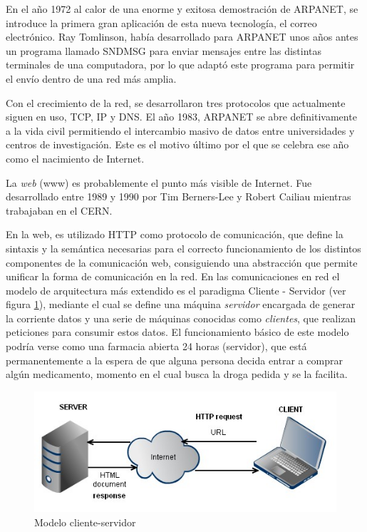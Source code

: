 En el año 1972 al calor de una enorme y exitosa demostración de \ac{ARPANET}, se introduce la primera gran aplicación de esta nueva tecnología, el correo electrónico. Ray Tomlinson, había desarrollado para \ac{ARPANET} unos años antes un programa llamado SNDMSG para enviar mensajes entre las distintas terminales de una computadora, por lo que adaptó este programa para permitir el envío dentro de una red más amplia.

Con el crecimiento de la red, se desarrollaron tres protocolos que actualmente siguen en uso, \ac{TCP}, \ac{IP} y \ac{DNS}. El año 1983, \ac{ARPANET} se abre definitivamente a la vida civil permitiendo el intercambio masivo de datos entre universidades y centros de investigación. Este es el motivo último por el que se celebra ese año como el nacimiento de Internet.

La \textit{web} (\ac{www}) es probablemente el punto más visible de Internet. Fue desarrollado entre 1989 y 1990 por Tim Berners-Lee y Robert Cailiau mientras trabajaban en el \ac{CERN}.

En la web, es utilizado \ac{HTTP} como protocolo de comunicación, que define la sintaxis y la semántica necesarias para el correcto funcionamiento de los distintos componentes de la comunicación web, consiguiendo una abstracción que permite unificar la forma de comunicación en la red. En las comunicaciones en red el modelo de arquitectura más extendido es el paradigma Cliente - Servidor (ver figura \ref{fig:cliente-servidor}), mediante el cual se define una máquina \textit{servidor} encargada de generar la corriente datos y una serie de máquinas conocidas como \textit{clientes}, que realizan peticiones para consumir estos datos. El funcionamiento básico de este modelo podría verse como una farmacia abierta 24 horas (servidor), que está permanentemente a la espera de que alguna persona decida entrar a comprar algún medicamento, momento en el cual busca la droga pedida y se la facilita.

\begin{figure}[h!btp]
\centering
\includegraphics[scale=0.75, fbox={\fboxrule} 4mm]{images/03-antecedentes/10-client_server.png}
\caption{Modelo cliente-servidor}
\label{fig:cliente-servidor}
\end{figure}

